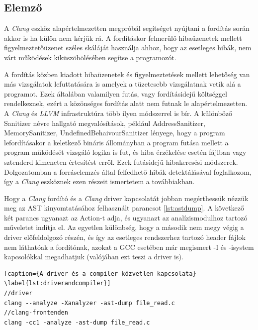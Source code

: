 \documentclass[a4paper,12pt]{report}
\begin{document}
\subsection{Elemző}
A \emph{Clang} eszköz alapértelmezetten megpróbál segítséget nyújtani a fordítás során akkor is ha külön nem kérjük rá. A fordításkor felmerülő hibaüzenetek mellett figyelmeztetőüzenet széles skáláját használja ahhoz, hogy az esetleges hibák, nem várt működések kiküszöbölésében segítse a programozót.

A fordítás közben kiadott hibaüzenetek és figyelmeztetések mellett lehetőség van más vizsgálatok lefuttatására is amelyek a tüzetesebb vizsgálatnak vetik alá a programot. Ezek általában valamilyen futás, vagy fordításidejű költséggel rendelkeznek, ezért a közönséges fordítás alatt nem futnak le alapértelmezetten.
A \emph{Clang} és \emph{LLVM} infrastruktúra több ilyen módszerrel is bír. A különböző Sanitizer névre hallgató megvalósítások, például AddressSanitizer, MemorySanitizer, UndefinedBehaivourSanitizer lényege, hogy a program lefordításakor a keletkező bináris állományban a program futása mellett a program működését vizsgáló logika is fut, és hiba érzékelése esetén fájlban vagy sztenderd kimeneten értesítést erről. Ezek futásidejű hibakeresési módszerek. Dolgozatomban a forráselemzés által felfedhető hibák detektálásával foglalkozom, így a \emph{Clang} eszköznek ezen részeit ismertetem a továbbiakban.

Hogy a \emph{Clang} fordító és a \emph{Clang} driver kapcsolatát jobban megérthessük nézzük meg az AST kinyomtatásához felhasznált parancsot \ref{lst:astdump}. A következő két parancs ugyanazt az Action-t adja, és ugyanazt az analízismodulhoz tartozó műveletet indítja el. Az egyetlen különbség, hogy a második nem megy végig a driver előfeldolgozó részén, és így az esetleges rendszerhez tartozó header fájlok nem láthatóak a fordítónak, azokat a GCC esetében már megismert -I és -isystem kapcsolókkal megadhatjuk (valójában ezt teszi a driver is).

\begin{lstlisting}[caption={A driver és a compiler közvetlen kapcsolata}
\label{lst:driverandcompiler}]
//driver
clang --analyze -Xanalyzer -ast-dump file_read.c
//clang-frontenden
clang -cc1 -analyze -ast-dump file_read.c
\end{lstlisting}
\end{document}
